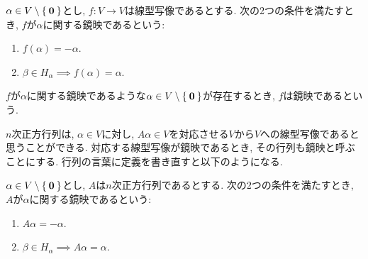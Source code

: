 \begin{definition}
  $\alpha \in V\setminus\Set{\boldsymbol{0}}$とし,
  $f\colon V\to V$は線型写像であるとする.
  次の2つの条件を満たすとき,
  $f$が$\alpha$に関する鏡映であるという:
  \begin{enumerate}
  \item $f(\alpha)=-\alpha$.
  \item $\beta \in H_\alpha \implies f(\alpha)=\alpha$.    
  \end{enumerate}
  $f$が$\alpha$に関する鏡映であるような$\alpha\in V\setminus\Set{\boldsymbol{0}}$が存在するとき,
  $f$は鏡映であるという.
\end{definition}
$n$次正方行列は,
$\alpha\in V$に対し,
$A\alpha\in V$を対応させる$V$から$V$への線型写像であると思うことができる.
対応する線型写像が鏡映であるとき, その行列も鏡映と呼ぶことにする.
行列の言葉に定義を書き直すと以下のようになる.
\begin{definition}
  $\alpha \in V\setminus\Set{\boldsymbol{0}}$とし,
  $A$は$n$次正方行列であるとする.
  次の2つの条件を満たすとき,
  $A$が$\alpha$に関する鏡映であるという:
  \begin{enumerate}
  \item $A\alpha=-\alpha$.
  \item $\beta \in H_\alpha \implies A\alpha=\alpha$.    
  \end{enumerate}
\end{definition}

